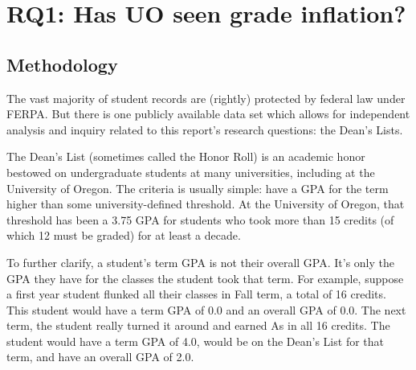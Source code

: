\documentclass[10pt]{article}
\begin{document}

\section{RQ1: Has UO seen grade inflation?}

\subsection{Methodology}
\label{sec:rq1-methodology}

The vast majority of student records are (rightly) protected by federal law under FERPA. But there is one publicly available data set which allows for independent analysis and inquiry related to this report's research questions: the Dean's Lists.

The Dean's List (sometimes called the Honor Roll) is an academic honor bestowed on undergraduate students at many universities, including at the University of Oregon. The criteria is usually simple: have a GPA for the term higher than some university-defined threshold. At the University of Oregon, that threshold has been a 3.75 GPA for students who took more than 15 credits (of which 12 must be graded) for at least a decade.

To further clarify, a student's term GPA is not their overall GPA. It's only the GPA they have for the classes the student took that term. For example, suppose a first year student flunked all their classes in Fall term, a total of 16 credits. This student would have a term GPA of 0.0 and an overall GPA of 0.0. The next term, the student really turned it around and earned As in all 16 credits. The student would have a term GPA of 4.0, would be on the Dean's List for that term, and have an overall GPA of 2.0.
\end{document}
